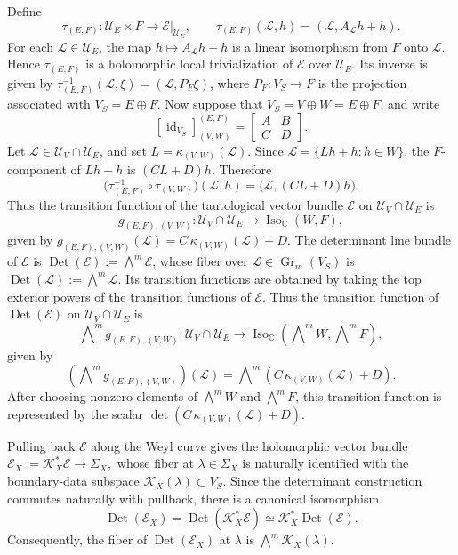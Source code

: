 \documentclass[12pt]{amsart}
\theoremstyle{plain}
\theoremstyle{definition}
\theoremstyle{remark}
\numberwithin{equation}{section} \numberwithin{figure}{section}
\renewcommand*{\to}{\rightarrow}
\newcommand{\mb}[1]{\mathbb{#1}} %
\newcommand{\mc}[1]{\mathcal{#1}}
\newcommand{\id}{\operatorname{id}}
\begin{document}
Define
\[
    \tau_{(E,F)}:
    \mc U_E\times F
    \longrightarrow
    \mc E|_{\mc U_E},
    \qquad
    \tau_{(E,F)}(\mc L,h)
    =
    (\mc L,A_{\mc L}h+h).
\]
For each \(\mc L\in\mc U_E\), the map
\(h\mapsto A_{\mc L}h+h\) is a linear isomorphism from \(F\) onto
\(\mc L\). Hence \(\tau_{(E,F)}\) is a holomorphic local
trivialization of \(\mc E\) over \(\mc U_E\). Its inverse is given by
\(\tau_{(E,F)}^{-1}(\mc L,\xi)=(\mc L,P_F\xi)\), where
\(P_F:V_S\to F\) is the projection associated with
\(V_S=E\oplus F\).
Now suppose that
\(V_S=V\oplus W=E\oplus F\), and write
\[
    [\id_{V_S}]_{(V,W)}^{(E,F)}
    =
    \begin{bmatrix}
        A&B\\
        C&D
    \end{bmatrix}.
\]
Let \(\mc L\in\mc U_V\cap\mc U_E\), and set
\(L=\kappa_{(V,W)}(\mc L)\). Since
\(\mc L=\{Lh+h:h\in W\}\), the \(F\)-component of \(Lh+h\) is
\((CL+D)h\). Therefore
\[
    \bigl(
        \tau_{(E,F)}^{-1}
        \circ
        \tau_{(V,W)}
    \bigr)(\mc L,h)
    =
    \bigl(\mc L,(CL+D)h\bigr).
\]
Thus the transition function of the tautological vector bundle
\(\mc E\) on \(\mc U_V\cap\mc U_E\) is
\[
    g_{(E,F),(V,W)}:
    \mc U_V\cap\mc U_E
    \longrightarrow
    \operatorname{Iso}_{\mb C}(W,F),
\]
given by
\(
    g_{(E,F),(V,W)}(\mc L)
    =
    C\,\kappa_{(V,W)}(\mc L)+D.
\)
The determinant line bundle of \(\mc E\) is
\(\operatorname{Det}(\mc E):=\bigwedge^m\mc E\), whose fiber over
\(\mc L\in\operatorname{Gr}_m(V_S)\) is
\(\operatorname{Det}(\mc L):=\bigwedge^m\mc L\). Its transition
functions are obtained by taking the top exterior powers of the
transition functions of \(\mc E\). Thus the transition function of
\(\operatorname{Det}(\mc E)\) on \(\mc U_V\cap\mc U_E\) is
\[
    \bigwedge\nolimits^m g_{(E,F),(V,W)}:
    \mc U_V\cap\mc U_E
    \longrightarrow
    \operatorname{Iso}_{\mb C}
    \left(
        \bigwedge\nolimits^m W,
        \bigwedge\nolimits^m F
    \right),
\]
given by
\[
    \left(
        \bigwedge\nolimits^m g_{(E,F),(V,W)}
    \right)(\mc L)
    =
    \bigwedge\nolimits^m
    \left(
        C\,\kappa_{(V,W)}(\mc L)+D
    \right).
\]
After choosing nonzero elements of
\(\bigwedge^m W\) and \(\bigwedge^m F\), this transition function is
represented by the scalar
\(
    \det\!\left(
        C\,\kappa_{(V,W)}(\mc L)+D
    \right).
\)

Pulling back \(\mc E\) along the Weyl curve gives the holomorphic
vector bundle
\(
    \mc E_X:=\mc K_X^*\mc E\to\Sigma_X,
\)
whose fiber at \(\lambda\in\Sigma_X\) is naturally identified with
the boundary-data subspace
\(\mc K_X(\lambda)\subset V_S\).
Since the determinant construction commutes naturally with pullback,
there is a canonical isomorphism
\[
    \operatorname{Det}(\mc E_X)
    =
    \operatorname{Det}(\mc K_X^*\mc E)
    \simeq
    \mc K_X^*\operatorname{Det}(\mc E).
\]
Consequently, the fiber of \(\operatorname{Det}(\mc E_X)\) at
\(\lambda\) is \(\bigwedge^m\mc K_X(\lambda)\).
\end{document}

